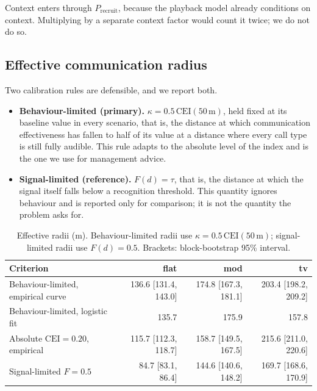 Context enters through $P_{\mathrm{recruit}}$, because the playback model already conditions on
context. Multiplying by a separate context factor would count it twice; we do not do so.

\subsection{Effective communication radius}\label{sec:q4-radius}

Two calibration rules are defensible, and we report both.

\begin{itemize}[leftmargin=1.6em,itemsep=3pt]
  \item \textbf{Behaviour-limited (primary).} $\kappa = 0.5\,\mathrm{CEI}(50\,\mathrm{m})$, held
        fixed at its baseline value in every scenario, that is,
        the distance at which communication effectiveness has fallen to half of its value at a
        distance where every call type is still fully audible. This rule adapts to the absolute
        level of the index and is the one we use for management advice.
  \item \textbf{Signal-limited (reference).} $F(d)=\tau$, that is, the distance at which the signal
        itself falls below a recognition threshold. This quantity ignores behaviour and is
        reported only for comparison; it is not the quantity the problem asks for.
\end{itemize}

\begin{table}[htbp]
  \centering
  \caption{Effective radii (m). Behaviour-limited radii use $\kappa=0.5\,\mathrm{CEI}(50\,\mathrm{m})$;
  signal-limited radii use $F(d)=0.5$. Brackets: block-bootstrap 95\% interval.}\label{tab:q4-radius}
  \small
  \begin{tabular}{lrrr}
    \toprule
    Criterion & flat & mod & tv \\
    \midrule
    Behaviour-limited, empirical curve & 136.6 [131.4, 143.0] & 174.8 [167.3, 181.1] & 203.4 [198.2, 209.2] \\
    Behaviour-limited, logistic fit & 135.7 & 175.9 & 157.8 \\
    Absolute $\mathrm{CEI}=0.20$, empirical & 115.7 [112.3, 118.7] & 158.7 [149.5, 167.5] & 215.6 [211.0, 220.6] \\
    Signal-limited $F=0.5$ & 84.7 [83.1, 86.4] & 144.6 [140.6, 148.2] & 169.7 [168.6, 170.9] \\
    \bottomrule
  \end{tabular}
\end{table}

